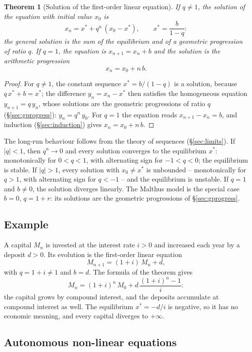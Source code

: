 \documentclass[11pt,a4paper]{article}
\theoremstyle{definition} \newtheorem{definition}{Definition} \theoremstyle{plain} \newtheorem{theorem}{Theorem}
\begin{document}
\begin{theorem}[Solution of the first-order linear equation]\label{thm:first-order-linear} If $q\neq 1$,
the solution of the equation with initial value $x_0$ is
\[ x_n = x^* + q^n\,(x_0-x^*), \qquad x^* = \frac{b}{1-q}: \]
the general solution is the sum of the equilibrium and of a geometric
progression of ratio $q$. If $q=1$, the equation is $x_{n+1}=x_n+b$ and
the solution is the arithmetic progression
\[ x_n = x_0 + n\,b. \]
\end{theorem}

\begin{proof} For $q\neq 1$, the constant sequence $x^*=b/(1-q)$ is a
solution, because $q\,x^*+b=x^*$; the difference $y_n=x_n-x^*$ then
satisfies the homogeneous equation $y_{n+1}=q\,y_n$, whose solutions are
the geometric progressions of ratio $q$ (\S\ref{sec:gprogress}): $y_n=q^n\,y_0$. For $q=1$
the equation reads $x_{n+1}-x_n=b$, and induction (\S\ref{sec:induction}) gives
$x_n=x_0+n\,b$. \end{proof}

The long-run behaviour follows from the theory of sequences (\S\ref{sec:limits}). If
$|q|<1$, then $q^n\to 0$ and every solution converges to the equilibrium
$x^*$: monotonically for $0<q<1$, with alternating sign for $-1<q<0$; the
equilibrium is stable. If $|q|>1$, every solution with $x_0\neq x^*$ is
unbounded -- monotonically for $q>1$, with alternating sign for $q<-1$ --
and the equilibrium is unstable. If $q=1$ and $b\neq 0$, the solution
diverges linearly. The Malthus model is the special case $b=0$, $q=1+r$:
its solutions are the geometric progressions of \S\ref{sec:gprogress}.

\subsection*{Example}

A capital $M_n$ is invested at the interest rate $i>0$ and increased each
year by a deposit $d>0$. Its evolution is the first-order linear equation
\[ M_{n+1} = (1+i)\,M_n + d, \]
with $q=1+i\neq 1$ and $b=d$. The formula of the theorem gives
\[ M_n = (1+i)^n\,M_0 + d\,\frac{(1+i)^n-1}{i}: \]
the capital grows by compound interest, and the deposits accumulate at
compound interest as well. The equilibrium $x^*=-d/i$ is negative, so it
has no economic meaning, and every capital diverges to $+\infty$.

\subsection{Autonomous non-linear equations}
\end{document}
